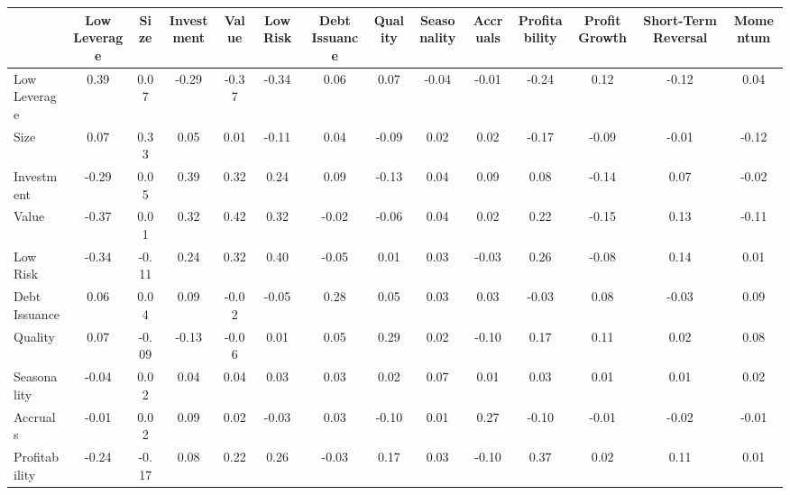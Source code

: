 \begin{tabular}{lccccccccccccc}
\toprule
{} &  Low Leverage &  Size &  Investment &  Value &  Low Risk &  Debt Issuance &  Quality &  Seasonality &  Accruals &  Profitability &  Profit Growth &  Short-Term Reversal &  Momentum \\
\midrule
Low Leverage        &          0.39 &  0.07 &       -0.29 &  -0.37 &     -0.34 &           0.06 &     0.07 &        -0.04 &     -0.01 &          -0.24 &           0.12 &                -0.12 &      0.04 \\
Size                &          0.07 &  0.33 &        0.05 &   0.01 &     -0.11 &           0.04 &    -0.09 &         0.02 &      0.02 &          -0.17 &          -0.09 &                -0.01 &     -0.12 \\
Investment          &         -0.29 &  0.05 &        0.39 &   0.32 &      0.24 &           0.09 &    -0.13 &         0.04 &      0.09 &           0.08 &          -0.14 &                 0.07 &     -0.02 \\
Value               &         -0.37 &  0.01 &        0.32 &   0.42 &      0.32 &          -0.02 &    -0.06 &         0.04 &      0.02 &           0.22 &          -0.15 &                 0.13 &     -0.11 \\
Low Risk            &         -0.34 & -0.11 &        0.24 &   0.32 &      0.40 &          -0.05 &     0.01 &         0.03 &     -0.03 &           0.26 &          -0.08 &                 0.14 &      0.01 \\
Debt Issuance       &          0.06 &  0.04 &        0.09 &  -0.02 &     -0.05 &           0.28 &     0.05 &         0.03 &      0.03 &          -0.03 &           0.08 &                -0.03 &      0.09 \\
Quality             &          0.07 & -0.09 &       -0.13 &  -0.06 &      0.01 &           0.05 &     0.29 &         0.02 &     -0.10 &           0.17 &           0.11 &                 0.02 &      0.08 \\
Seasonality         &         -0.04 &  0.02 &        0.04 &   0.04 &      0.03 &           0.03 &     0.02 &         0.07 &      0.01 &           0.03 &           0.01 &                 0.01 &      0.02 \\
Accruals            &         -0.01 &  0.02 &        0.09 &   0.02 &     -0.03 &           0.03 &    -0.10 &         0.01 &      0.27 &          -0.10 &          -0.01 &                -0.02 &     -0.01 \\
Profitability       &         -0.24 & -0.17 &        0.08 &   0.22 &      0.26 &          -0.03 &     0.17 &         0.03 &     -0.10 &           0.37 &           0.02 &                 0.11 &      0.01 \\

\end{tabular}
